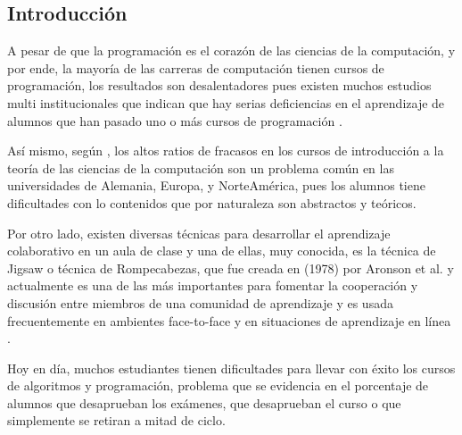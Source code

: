 \documentclass[twoside]{article}
\begin{document}

\begin{multicols}{2} %

\section{Introducción}

A pesar de que la programación es el corazón de las ciencias de la computación, y por ende, la mayoría de las carreras de computación tienen cursos de programación, los resultados son desalentadores pues existen muchos estudios multi institucionales que indican que hay serias deficiencias en el aprendizaje de alumnos que han pasado uno o más cursos de programación \cite{mccracken_multi-national_2001,lister_multi-national_2004,Tenenberg_studentsdesigning_2005}. 

Así mismo, según , los altos ratios de fracasos en los cursos de introducción a la teoría de las ciencias de la computación son un problema común en las universidades de Alemania, Europa, y NorteAmérica, pues los alumnos tiene dificultades con lo contenidos que por naturaleza son abstractos y teóricos. 

Por otro lado, existen diversas técnicas para desarrollar el aprendizaje colaborativo en un aula de clase y una de ellas, muy conocida, es la técnica de Jigsaw o técnica de Rompecabezas, que fue creada en (1978) por Aronson et al. y actualmente es una de las más importantes para fomentar la cooperación y discusión entre miembros de una comunidad de aprendizaje y es usada frecuentemente en ambientes face-to-face y en situaciones de aprendizaje en línea \cite{blocher_increasing_2005}.

Hoy en día, muchos estudiantes tienen dificultades para llevar con éxito los cursos de algoritmos y programación, problema que se evidencia en el porcentaje de alumnos que desaprueban los exámenes, que desaprueban el curso o que simplemente se retiran a mitad de ciclo.


\end{multicols}
\end{document}
